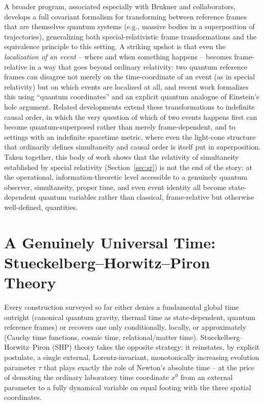 \documentclass[11pt]{article}
\begin{document}
A broader program, associated especially with Brukner and collaborators, develops a full covariant formalism for transforming between reference frames that are themselves quantum systems (e.g., massive bodies in a superposition of trajectories), generalizing both special-relativistic frame transformations and the equivalence principle to this setting. A striking upshot is that even the \emph{localization of an event} -- where and when something happens -- becomes frame-relative in a way that goes beyond ordinary relativity: two quantum reference frames can disagree not merely on the time-coordinate of an event (as in special relativity) but on which events are localized at all, and recent work formalizes this using ``quantum coordinates'' and an explicit quantum analogue of Einstein's hole argument. Related developments extend these transformations to indefinite causal order, in which the very question of which of two events happens first can become quantum-superposed rather than merely frame-dependent, and to settings with an indefinite spacetime metric, where even the light-cone structure that ordinarily defines simultaneity and causal order is itself put in superposition. Taken together, this body of work shows that the relativity of simultaneity established by special relativity (Section~\ref{sec:sr}) is not the end of the story: at the operational, information-theoretic level accessible to a genuinely quantum observer, simultaneity, proper time, and even event identity all become state-dependent quantum variables rather than classical, frame-relative but otherwise well-defined, quantities.

\section{A Genuinely Universal Time: Stueckelberg--Horwitz--Piron Theory}
\label{sec:shp}

Every construction surveyed so far either denies a fundamental global time outright (canonical quantum gravity, thermal time as state-dependent, quantum reference frames) or recovers one only conditionally, locally, or approximately (Cauchy time functions, cosmic time, relational/matter time). Stueckelberg--Horwitz--Piron (SHP) theory takes the opposite strategy: it reinstates, by explicit postulate, a single external, Lorentz-invariant, monotonically increasing evolution parameter $\tau$ that plays exactly the role of Newton's absolute time -- at the price of demoting the ordinary laboratory time coordinate $x^0$ from an external parameter to a fully dynamical variable on equal footing with the three spatial coordinates.
\end{document}
